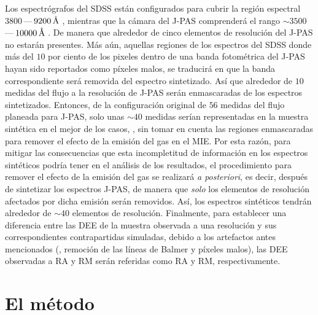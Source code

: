 Los espectrógrafos del SDSS están configurados para cubrir la región espectral
$3800\,$---$\,\unit[9200]{\AA}$ \citep{Strauss2002}, mientras que la cámara del J-PAS comprenderá el
rango $\sim3500\,$---$\,\unit[10000]{\AA}$ \citep{Marin-Franch2015}. De manera que alrededor de
cinco elementos de resolución del J-PAS no estarán presentes. Más aún, aquellas regiones de los
espectros del SDSS donde más del $10$ por ciento de los pixeles dentro de una banda fotométrica del
J-PAS hayan sido reportados como píxeles malos, se traducirá en que la banda correspondiente será
removida del espectro sintetizado. Así que alrededor de $10$ medidas del flujo a la resolución de
J-PAS serán enmascaradas de los espectros sintetizados. Entonces, de la configuración original de
$56$ medidas del flujo planeada para J-PAS, solo unas $\sim40$ medidas serían representadas en la
muestra sintética en el mejor de los casos, \ie, sin tomar en cuenta las regiones enmascaradas para
remover el efecto de la emisión del gas en el MIE. Por esta razón, para mitigar las consecuencias
que esta incompletitud de información en los espectros sintéticos podría tener en el análisis de los
resultados, el procedimiento para remover el efecto de la emisión del gas se realizará \emph{a
posteriori}, es decir, después de sintetizar los espectros J-PAS, de manera que \emph{solo} los
elementos de resolución afectados por dicha emisión serán removidos. Así, los espectros sintéticos
tendrán alrededor de $\sim40$ elementos de resolución. Finalmente, para establecer una diferencia
entre las DEE de la muestra observada a una resolución y sus correspondientes contrapartidas
simuladas, debido a los artefactos antes mencionados (\eg, remoción de las líneas de Balmer y
píxeles malos), las DEE observadas a RA y RM serán referidas como RA\up{*} y RM\up{*},
respectivamente.


\section{El método}

